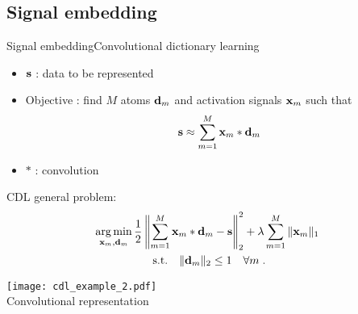 \subsection{Signal embedding}

\begin{frame}{Signal embedding}{Convolutional dictionary learning}
\vspace{0.3cm}
\begin{minipage}[t]{0.45\linewidth}\vspace{0pt}
    \begin{itemize}
        \item $\mathbf{s}$ : data to be represented
        \item Objective : find $M$ atoms $\mathbf{d}_m$ and activation signals $\mathbf{x}_m$ such that
        $$\mathbf{s} \approx \sum_{m=1}^{M}\mathbf{x}_m * \mathbf{d}_m$$
        \item $*$ : convolution
    \end{itemize}
    CDL general problem:
    \begin{gather*}\label{eq:cdl_baseform}
    \operatorname*{arg\,min}_{\mathbf{x}_m,\mathbf{d}_m} \frac{1}{2} \left\| \sum_{m=1}^{M} \mathbf{x}_{m} * \mathbf{d}_m - \mathbf{s} \right\|_2^2 + \lambda \sum_{m=1}^{M} \|\mathbf{x}_m \|_1 \ \\
        \text{s.t.}\quad \| \mathbf{d}_m\|_2 \leq 1 \quad \forall m \;. \nonumber
    \end{gather*}
\end{minipage}\hfill
\begin{minipage}[t]{0.45\linewidth}\vspace{0pt}
    \centering
        \centering
        \texttt{[image: cdl\_example\_2.pdf]}\\
        \smallskip
        {\small Convolutional representation}
\end{minipage}

\end{frame}

